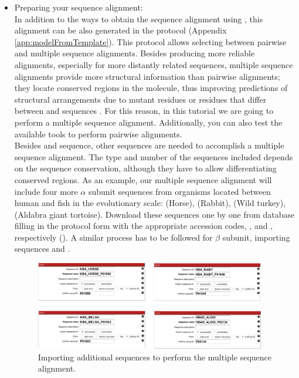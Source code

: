  \begin{itemize}
 \item Preparing your sequence alignment:\\
In addition to the ways to obtain the  sequence alignment using \chimera, this alignment can be also generated in the \scipion protocol  (Appendix \ref{app:modelFromTemplate}). This protocol allows selecting between pairwise and multiple sequence alignments. Besides producing more reliable alignments, especially for more distantly related sequences, multiple sequence alignments provide more structural information than pairwise alignments; they locate conserved regions in the molecule, thus improving predictions of structural arrangements due to mutant residues or residues that differ between  and  sequences \citep{pearson2013}. For this reason, in this tutorial we are going to perform a multiple sequence alignment. Additionally, you can also test the available tools to perform pairwise alignments.\\
 
Besides  and  sequence, other sequences are needed to accomplish a multiple sequence alignment. The type and number of the sequences included depends on the sequence conservation, although they have to allow differentiating conserved regions. As an example, our multiple sequence alignment will include four more  $\alpha$ subunit sequences from organisms located between human and fish in the evolutionary scale:  (Horse),  (Rabbit),  (Wild turkey),  (Aldabra giant tortoise). Download these sequences one by one from  database filling in the  protocol form with the appropriate accession codes, , and , respectively (). A similar process has to be followed for  $\beta$ subunit, importing  sequences  and .

  \begin{figure}[H]
  \centering 
  \captionsetup{width=.7\linewidth} 
  \includegraphics[width=0.95\textwidth]{Images/Fig12}
  \caption{Importing additional sequences to perform the multiple sequence alignment.}
  \label{fig:multialignment_sequences}
  \end{figure}


\end{itemize}
